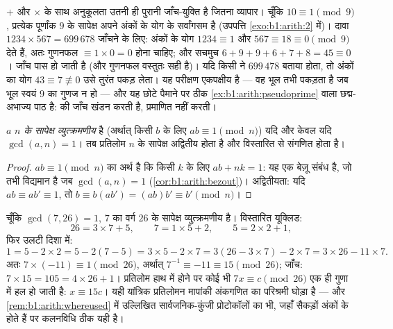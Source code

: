 \begin{example}[नवशेष परीक्षण]\label{ex:b1:arith:castingnines}
$+$ और $\times$ के साथ अनुकूलता उतनी ही पुरानी जाँच-युक्ति है जितना व्यापार।
चूँकि $10 \equiv 1 \pmod 9$, प्रत्येक पूर्णांक $9$ के सापेक्ष अपने अंकों के
योग के सर्वांगसम है (उपपत्ति \cref{exo:b1:arith:2} में)। दावा $1234 \times
567 = 699\,678$ जाँचने के लिए: अंकों के योग $1234 \equiv 1$ और $567 \equiv
18 \equiv 0 \pmod 9$ देते हैं, अतः गुणनफल $\equiv 1 \times 0 = 0$ होना
चाहिए; और सचमुच $6 + 9 + 9 + 6 + 7 + 8 = 45 \equiv 0$। जाँच पास हो जाती है
(और गुणनफल वस्तुतः सही है)। यदि किसी ने $699\,478$ बताया होता, तो अंकों का
योग $43 \equiv 7 \not\equiv 0$ उसे तुरंत पकड़ लेता। यह परीक्षण एकपक्षीय है
--- वह भूल तभी पकड़ता है जब भूल स्वयं $9$ का गुणज न हो --- और यह छोटे पैमाने
पर ठीक \cref{ex:b1:arith:pseudoprime} वाला छद्म-अभाज्य पाठ है: 
की जाँच खंडन करती है, प्रमाणित नहीं करती।
\end{example}

\begin{proposition}[$n$ के सापेक्ष व्युत्क्रमणीयता]\label{prop:b1:arith:invmod}
$a$ \emph{$n$ के सापेक्ष व्युत्क्रमणीय} है (अर्थात् किसी $b$ के लिए $ab
\equiv 1 \pmod n$) यदि और केवल यदि $\gcd(a, n) = 1$। तब प्रतिलोम $n$ के
सापेक्ष अद्वितीय होता है और विस्तारित  से संगणित होता है।
\end{proposition}

\begin{proof}
$ab \equiv 1 \pmod n$ का अर्थ है कि किसी $k$ के लिए $ab + nk = 1$: यह एक
बेज़ू संबंध है, जो तभी विद्यमान है जब $\gcd(a,n) = 1$
(\cref{cor:b1:arith:bezout})। अद्वितीयता: यदि $ab \equiv ab' \equiv 1$, तो
$b \equiv b(ab') = (ab)b' \equiv b' \pmod n$।
\end{proof}

\begin{example}[$26$ के सापेक्ष $7$ का प्रतिलोम]\label{ex:b1:arith:inv7mod26}
चूँकि $\gcd(7, 26) = 1$, $7$ का वर्ग $26$ के सापेक्ष व्युत्क्रमणीय है।
विस्तारित यूक्लिड:
\[
26 = 3 \times 7 + 5, \qquad
7 = 1 \times 5 + 2, \qquad
5 = 2 \times 2 + 1 ,
\]
फिर उलटी दिशा में:
\[
1 = 5 - 2 \times 2 = 5 - 2(7 - 5) = 3 \times 5 - 2 \times 7
= 3(26 - 3 \times 7) - 2 \times 7 = 3 \times 26 - 11 \times 7 .
\]
अतः $7 \times (-11) \equiv 1 \pmod{26}$, अर्थात् $7^{-1} \equiv -11 \equiv
15 \pmod{26}$; जाँच: $7 \times 15 = 105 = 4 \times 26 + 1$। प्रतिलोम हाथ में
होने पर कोई भी  $7x \equiv c \pmod{26}$ एक ही गुणा में हल हो जाती
है: $x \equiv 15c$। यही यांत्रिक प्रतिलोमन मापांकी अंकगणित का परिश्रमी घोड़ा
है --- और \cref{rem:b1:arith:whereused} में उल्लिखित सार्वजनिक-कुंजी
प्रोटोकॉलों का भी, जहाँ  सैकड़ों अंकों के होते हैं पर कलनविधि ठीक यही
है।
\end{example}

